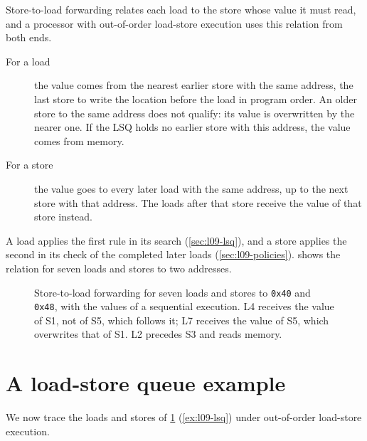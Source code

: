 \documentclass[../main.tex]{subfiles}
\begin{document}
Store-to-load forwarding relates each load to the store whose value it must
read, and a processor with out-of-order load-store execution uses this relation
from both ends.
\begin{description}
  \item[For a load] the value comes from the nearest earlier store with the
    same address, the last store to write the location before the load in
    program order.  An older store to the same address does not qualify: its
    value is overwritten by the nearer one.  If the LSQ holds no earlier store
    with this address, the value comes from memory.
  \item[For a store] the value goes to every later load with the same address,
    up to the next store with that address.  The loads after that store receive
    the value of that store instead.
\end{description}
A load applies the first rule in its search (\cref{sec:l09-lsq}), and a store
applies the second in its check of the completed later loads
(\cref{sec:l09-policies}).   shows the relation for
seven loads and stores to two addresses.

\begin{figure}[htbp]
  \centering
  
  \caption{Store-to-load forwarding for seven loads and stores to
    \texttt{0x40} and \texttt{0x48}, with the values of a sequential
    execution.  L4 receives the value of S1, not of S5, which follows it; L7
    receives the value of S5, which overwrites that of S1.  L2 precedes S3 and
    reads memory.}
  \label{fig:l09-forwarding}
\end{figure}

\section{A load-store queue example}
\label{sec:l09-example}

We now trace the loads and stores of \cref{fig:l09-forwarding}
(\cref{ex:l09-lsq}) under out-of-order load-store execution.
\end{document}
